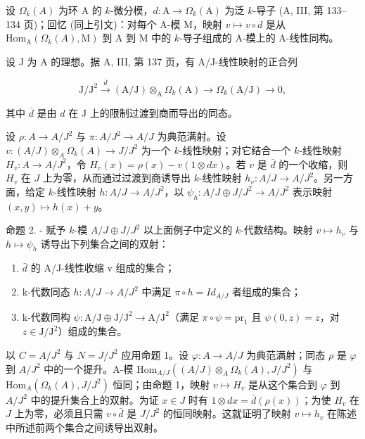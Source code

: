 设 \(\Omega_{k}(A)\) 为环 A 的 \(k\)-微分模，\(d: \mathrm{A} \longrightarrow \Omega_{k}(\mathrm{A})\) 为泛 \(k\)-导子 (A, III, 第 133–134 页)；回忆 (同上引文)：对每个 A-模 M，映射 \(v \mapsto v \circ d\) 是从 \(\mathrm{Hom}_{\mathrm{A}}(\Omega_{k}(A), \mathrm{M})\) 到 A 到 M 中的 \(k\)-导子组成的 A-模上的 A-线性同构。

设 J 为 A 的理想。据 A, III, 第 137 页，有 A/J-线性映射的正合列

\[
\mathrm{J} / \mathrm{J} ^ {2} \stackrel {\bar {d}} {\longrightarrow} (\mathrm{A} / \mathrm{J}) \otimes_ {\mathrm{A}} \Omega_ {k} (\mathrm{A}) \longrightarrow \Omega_ {k} (\mathrm{A} / \mathrm{J}) \rightarrow 0,
\]

其中 \(\bar{d}\) 是由 \(d\) 在 J 上的限制过渡到商而导出的同态。

设 \(\rho : A \to A/J^{2}\) 与 \(\pi : A/J^{2} \to A/J\) 为典范满射。设 \(v : (A/J) \otimes_{A} \Omega_{k}(A) \longrightarrow J/J^{2}\) 为一个 \(k\)-线性映射；对它结合一个 \(k\)-线性映射 \(H_{v} : A \to A/J^{2}\)，令 \(H_{v}(x) = \rho(x) - v(1 \otimes dx)\)。若 \(v\) 是 \(\bar{d}\) 的一个收缩，则 \(H_{v}\) 在 \(J\) 上为零，从而通过过渡到商诱导出 \(k\)-线性映射 \(h_{v} : A/J \to A/J^{2}\)。另一方面，给定 \(k\)-线性映射 \(h : A/J \to A/J^{2}\)，以 \(\psi_{h} : A/J \oplus J/J^{2} \longrightarrow A/J^{2}\) 表示映射 \((x,y) \mapsto h(x)+y\)。

命题 2. - 赋予 \(k\)-模 \(A / J \oplus J / J^2\) 以上面例子中定义的 \(k\)-代数结构。映射 \(v \mapsto h_v\) 与 \(h \mapsto \psi_h\) 诱导出下列集合之间的双射：

\begin{enumerate}
\def\labelenumi{(\roman{enumi})}
\item
  \(\bar{d}\) 的 A/J-线性收缩 v 组成的集合；
\item
  k-代数同态 \(h: A/J \to A/J^{2}\) 中满足 \(\pi \circ h = Id_{A/J}\) 者组成的集合；
\item
  k-代数同构 \(\psi : \mathrm{A} / \mathrm{J} \oplus \mathrm{J} / \mathrm{J}^2 \longrightarrow \mathrm{A} / \mathrm{J}^2\)（满足 \(\pi \circ \psi = \mathrm{pr}_1\) 且 \(\psi(0, z) = z\)，对 \(z \in \mathrm{J} / \mathrm{J}^2\)）组成的集合。
\end{enumerate}

以 \(C = A / J^2\) 与 \(N = J / J^2\) 应用命题 1。设 \(\varphi : A \to A / J\) 为典范满射；同态 \(\rho\) 是 \(\varphi\) 到 \(A / J^2\) 中的一个提升。A-模 \(\text{Hom}_{A / J}((A / J) \otimes_A \Omega_k(A), J / J^2)\) 与 \(\text{Hom}_A(\Omega_k(A), J / J^2)\) 恒同；由命题 1，映射 \(v \mapsto H_v\) 是从这个集合到 \(\varphi\) 到 \(A / J^2\) 中的提升集合上的双射。为证 \(x \in J\) 时有 \(1 \otimes dx = \bar{d}(\rho(x))\)；为使 \(H_v\) 在 \(J\) 上为零，必须且只需 \(v \circ \bar{d}\) 是 \(J / J^2\) 的恒同映射。这就证明了映射 \(v \mapsto h_v\) 在陈述中所述前两个集合之间诱导出双射。

